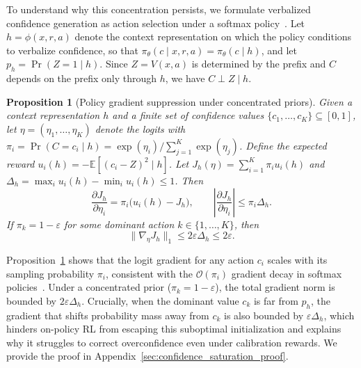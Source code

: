 \documentclass{article} %
\newtheorem{proposition}{Proposition}
\begin{document}
To understand why this concentration persists,
we formulate verbalized confidence generation as action selection under a softmax policy~\citep{garg2022alternate}.
Let $h = \phi(x, r, a)$ denote the context representation on which the policy conditions to verbalize confidence, so that $\pi_\theta(c \mid x, r, a) = \pi_\theta(c \mid h)$, and let $p_h = \Pr(Z = 1 \mid h)$.
Since $Z = V(x, a)$ is determined by the prefix and $C$ depends on the prefix only through $h$, we have $C \perp Z \mid h$.

\begin{proposition}[Policy gradient suppression under concentrated priors]
\label{prop:confidence_saturation}
Given a context representation $h$ and a finite set of confidence values $\{c_1, \ldots, c_K\} \subseteq [0, 1]$, let $\eta = (\eta_1, \ldots, \eta_K)$ denote the logits with $\pi_i = \Pr(C = c_i \mid h) = \exp(\eta_i)/\sum_{j=1}^K\exp(\eta_j)$.
Define the expected reward $u_i(h) = -\mathbb E[(c_i - Z)^2 \mid h]$.
Let $J_h(\eta) = \sum_{i=1}^K \pi_i u_i(h)$ and $\Delta_h = \max_i u_i(h) - \min_i u_i(h) \le 1$. Then
\begin{equation}
    \label{eq:logit_gradient}
    \frac{\partial J_h}{\partial\eta_i} = \pi_i \bigl(u_i(h) - J_h\bigr),
    \qquad
    \left|\frac{\partial J_h}{\partial\eta_i}\right| \le \pi_i \Delta_h.
\end{equation}
If $\pi_k = 1 - \varepsilon$ for some dominant action $k \in \{1, \ldots, K\}$, then
\begin{equation}
    \label{eq:logit_gradient_bound}
    \|\nabla_\eta J_h\|_1 \le 2\varepsilon \Delta_h \le 2\varepsilon.
\end{equation}
\end{proposition}


Proposition~\ref{prop:confidence_saturation} shows that the logit gradient for any action $c_i$ scales with its sampling probability $\pi_i$, consistent with the $\mathcal{O}(\pi_i)$ gradient decay in softmax policies~\citep{mei2020global}.
Under a concentrated prior ($\pi_k = 1 - \varepsilon$), the total gradient norm is bounded by $2\varepsilon\Delta_h$.
Crucially, when the dominant value $c_k$ is far from $p_h$, the gradient that shifts probability mass away from $c_k$ is also bounded by $\varepsilon\Delta_h$, which hinders on-policy RL from escaping this suboptimal initialization and explains why it struggles to correct overconfidence even under calibration rewards.
We provide the proof in Appendix~\ref{sec:confidence_saturation_proof}.
\end{document}
